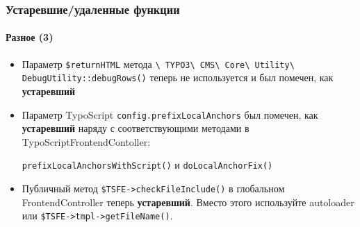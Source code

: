 \begin{frame}[fragile]
	\frametitle{Устаревшие/удаленные функции}
	\framesubtitle{Разное (3)}

	\begin{itemize}

		\item Параметр \texttt{\$returnHTML} метода
			\small
				\texttt{\textbackslash
					TYPO3\textbackslash
					CMS\textbackslash
					Core\textbackslash
					Utility\textbackslash
					DebugUtility::debugRows()}
			\normalsize
			теперь не используется и был помечен, как \textbf{устаревший}

		\item Параметр TypoScript
			\small\texttt{config.prefixLocalAnchors}\normalsize\space
			был помечен, как \textbf{устаревший} наряду с соответствующими методами
			в TypoScriptFrontendContoller:

			\small\texttt{prefixLocalAnchorsWithScript()}\normalsize\space
			и
			\small\texttt{doLocalAnchorFix()}\normalsize

		\item Публичный метод
			\small\texttt{\$TSFE->checkFileInclude()}\normalsize\space
			в глобальном FrontendController теперь \textbf{устаревший}.
			Вместо этого используйте autoloader или \texttt{\$TSFE->tmpl->getFileName()}.

	\end{itemize}

\end{frame}


